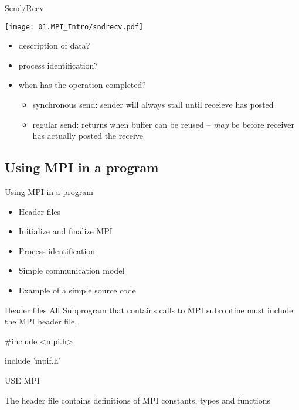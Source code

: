 \documentclass[aspectratio=43]{beamer}
\begin{document}
\begin{frame}{Send/Recv}

\begin{center}
\texttt{[image: 01.MPI\_Intro/sndrecv.pdf]}
\end{center}

\begin{itemize}
\item description of data?
\item process identification?
\item when has the operation completed?
\begin{itemize}
\item synchronous send: sender will always stall until receieve has posted
\item regular send: returns when buffer can be reused -- \textit{may} be before receiver has actually posted the receive
\end{itemize}
\end{itemize}
\end{frame}

\subsection{Using MPI in a program}
\begin{frame}{Using MPI in a program}
\begin{itemize}
\item Header files
\item Initialize and finalize MPI
\item Process identification
\item Simple communication model
\item Example of a simple source code
\end{itemize}
\end{frame}

\begin{frame}[fragile]{Header files}
All Subprogram that contains calls to MPI subroutine must include the MPI header file.\\
\begin{Pseudolisting}[]{}
#include <mpi.h>
\end{Pseudolisting}
\begin{Fortranlisting}[77]{}
include 'mpif.h'
\end{Fortranlisting}
\begin{Fortranlisting}[90]{}
USE MPI
\end{Fortranlisting}
The header file contains definitions of MPI constants, types and functions
\end{frame}
\end{document}

